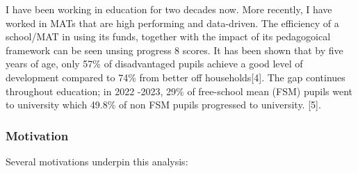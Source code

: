\documentclass[
  letterpaper,
  DIV=11,
  numbers=noendperiod]{scrartcl}
\begin{document}
I have been working in education for two decades now. More recently, I
have worked in MATs that are high performing and data-driven. The
efficiency of a school/MAT in using its funds, together with the impact
of its pedagogoical framework can be seen unsing progress 8 scores. It
has been shown that by five years of age, only 57\% of disadvantaged
pupils achieve a good level of development compared to 74\% from better
off households{[}4{]}. The gap continues throughout education; in 2022
-2023, 29\% of free-school mean (FSM) pupils went to university which
49.8\% of non FSM pupils progressed to university. {[}5{]}.

\subsubsection{Motivation}\label{motivation}

Several motivations underpin this analysis:
\end{document}
